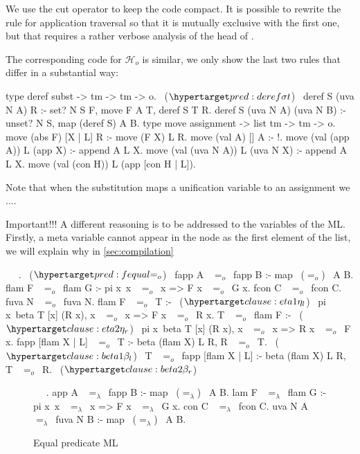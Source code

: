 \documentclass[sigconf,natbib=false]{acmart}
\newcommand{\EqualRel}{\ensuremath{=}}
\newcommand{\Eo}{\ensuremath{\EqualRel_o}\xspace}
\newcommand{\Ee}{\ensuremath{\EqualRel_\lambda}\xspace}
\newcommand{\Ho}{\ensuremath{\mathcal{H}_o}\xspace}
\begin{document}
\noindent
We use the cut operator to keep the code compact. It is possible to rewrite
the rule for application traversal so that it is mutually exclusive with the
first one, but that requires a rather verbose analysis of the head of .

The corresponding code for \Ho is similar, we only show the last two rules that
differ in a substantial way:

\begin{elpicode}
type deref subst -> tm -> tm -> o.                   ~($\customlabel{pred:deref}{\sigma t}$)~
deref S (uva N A) R :- set? N S F, move F A T, deref S T R.
deref S (uva N A) (uva N B) :- unset? N S, map (deref S) A B.
type move assignment -> list tm -> tm -> o.
move (abs F) [X | L] R :- move (F X) L R.
move (val A)         [] A :- !.
move (val (app A))   L (app X) :- append A L X.
move (val (uva N A)) L (uva N X) :- append A L X.
move (val (con H))   L (app [con H | L]).
\end{elpicode}

\noindent
Note that when the substitution  maps a unification variable
 to an assignment  we ....

Important!!!
A different reasoning is to be addressed to the variables of the ML. Firstly, a
meta variable cannot appear in the  node as the first element of the
list, we will explain why in \cref{sec:compilation}

\begin{elpicode}
  ~ \PYG{n+nf}{(\Eo)} ~.                           ~($\customlabel{pred:fequal}{\Eo}$)~
  fapp A ~\Eo~fapp B :- map ~(\Eo)~ A B.
  flam F ~\Eo~flam G :- pi x\ x ~\Eo~x => F x ~\Eo~G x.
  fcon C ~\Eo~fcon C.
  fuva N ~\Eo~fuva N.
  flam F ~\Eo~T :-                                       ~($\customlabel{clause:eta1}{\eta_l}$)~
    pi x\ beta T [x] (R x), x ~\Eo~x => F x ~\Eo~R x.
  T ~\Eo~flam F :-                                       ~($\customlabel{clause:eta2}{\eta_r}$)~
    pi x\ beta T [x] (R x), x ~\Eo~x => R x ~\Eo~F x.
  fapp [flam X | L] ~\Eo~T :- beta (flam X) L R, R ~\Eo~T. ~($\customlabel{clause:beta1}{\beta_l}$)~
  T ~\Eo~fapp [flam X | L] :- beta (flam X) L R, T ~\Eo~R. ~($\customlabel{clause:beta2}{\beta_r}$)~
\end{elpicode}

\begin{figure}
  \begin{elpicode}
    ~ \PYG{n+nf}{(\Ee)} ~.
    app A ~\Ee~fapp B :- map ~(\Ee)~ A B.
    lam F ~\Ee~flam G :- pi x\ x ~\Ee~x => F x ~\Ee~G x.
    con C ~\Ee~fcon C.
    uva N A ~\Ee~fuva N B :- map ~(\Ee)~ A B.
  \end{elpicode}
  \caption{Equal predicate ML}
  \label{code:eq-pred-meta}
\end{figure}
\end{document}
